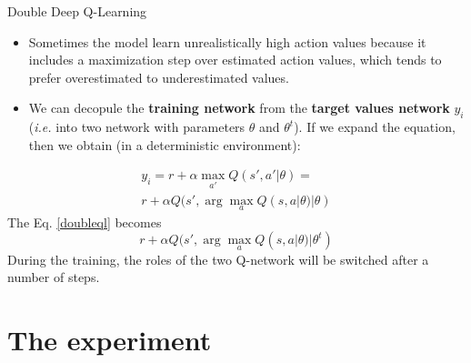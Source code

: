 \documentclass{beamer}
\begin{document}
\begin{frame}{Double Deep Q-Learning}
	\begin{itemize}
	\item Sometimes the model learn unrealistically high action values because it includes a maximization step over estimated action values, which tends to prefer overestimated to underestimated values. 
	\item We can decopule the \textbf{training network} from the \textbf{target values network} $y_i$ (\textit{i.e.} into two network with parameters $\theta$ and $\theta^t $). If we expand the equation, then we obtain (in a deterministic environment):
	\end{itemize}

	\begin{equation}
	\label{doubleql}
	\begin{aligned}
	y_i =  r + \alpha \max_{a'} Q(s', a'|\theta) = \\
	r + \alpha Q(s', \arg \max_a Q(s, a|\theta)  |\theta)
	\end{aligned}
	\end{equation}
	The Eq. \ref{doubleql} becomes
	\begin{equation}
	r + \alpha Q(s', \arg \max_a Q(s, a|\theta)  |\theta^t)
	\end{equation}
	During the training, the roles of the two Q-network will be switched after a number of steps. 
\end{frame}

\section{The experiment}
\end{document}
